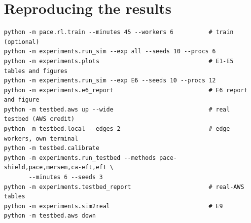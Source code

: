 \documentclass[11pt,a4paper]{article}
\begin{document}
\appendix
\section{Reproducing the results}\label{app:repro}
\begin{small}
\begin{verbatim}
python -m pace.rl.train --minutes 45 --workers 6          # train (optional)
python -m experiments.run_sim --exp all --seeds 10 --procs 6
python -m experiments.plots                               # E1-E5 tables and figures
python -m experiments.run_sim --exp E6 --seeds 10 --procs 12
python -m experiments.e6_report                           # E6 report and figure
python -m testbed.aws up --wide                           # real testbed (AWS credit)
python -m testbed.local --edges 2                         # edge workers, own terminal
python -m testbed.calibrate
python -m experiments.run_testbed --methods pace-shield,pace,mersem,ca-eft,eft \
       --minutes 6 --seeds 3
python -m experiments.testbed_report                      # real-AWS tables
python -m experiments.sim2real                            # E9
python -m testbed.aws down
\end{verbatim}
\end{small}
\end{document}
